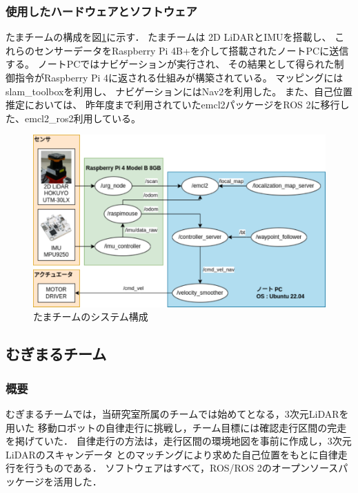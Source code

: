 \documentclass[twocolumn,9pt]{jsproceedings}
\begin{document}
\subsubsection{使用したハードウェアとソフトウェア}

たまチームの構成を図\ref{fig:tama_system_diagram}に示す．
たまチームは 2D LiDARとIMUを搭載し、
これらのセンサーデータをRaspberry Pi 4B+を介して搭載されたノートPCに送信する。
ノートPCではナビゲーションが実行され、
その結果として得られた制御指令がRaspberry Pi 4に返される仕組みが構築されている。
マッピングにはslam\_toolboxを利用し、
ナビゲーションにはNav2を利用した。
また、自己位置推定においては、
昨年度まで利用されていたemcl2パッケージをROS 2に移行した、emcl2\_ros2利用している。

\begin{figure}[h]
  \begin{center}
    \includegraphics[width=1.0\linewidth]{figs/tama_system_diagram.pdf}
    \caption{たまチームのシステム構成}
    \label{fig:tama_system_diagram}
  \end{center}
\end{figure}

\subsection{むぎまるチーム}

\subsubsection{概要}

むぎまるチームでは，当研究室所属のチームでは始めてとなる，3次元LiDARを用いた
移動ロボットの自律走行に挑戦し，チーム目標には確認走行区間の完走を掲げていた．
自律走行の方法は，走行区間の環境地図を事前に作成し，3次元LiDARのスキャンデータ
とのマッチングにより求めた自己位置をもとに自律走行を行うものである．
ソフトウェアはすべて，ROS/ROS 2のオープンソースパッケージを活用した．
\end{document}

